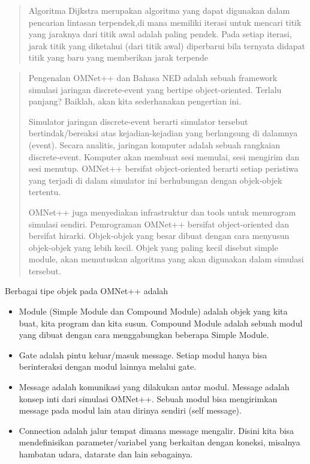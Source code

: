 \documentclass[conference]{IEEEtran}
\begin{document}
\begin{abstract}
    Algoritma Dijkstra merupakan algoritma yang dapat digunakan dalam
    pencarian lintasan terpendek,di mana memiliki iterasi untuk mencari titik yang jaraknya
    dari titik awal adalah paling pendek. Pada setiap iterasi, jarak titik yang diketahui (dari titik
    awal) diperbarui bila ternyata didapat titik yang baru yang memberikan jarak terpende

\end{abstract}
\begin{abstract}
Pengenalan OMNet++ dan Bahasa NED
      adalah sebuah framework simulasi jaringan discrete-event yang bertipe object-oriented. Terlalu panjang? Baiklah, akan kita sederhanakan pengertian ini.

Simulator jaringan discrete-event berarti simulator tersebut bertindak/bereaksi atas kejadian-kejadian yang berlangsung di dalamnya (event). Secara analitis, jaringan komputer adalah sebuah rangkaian discrete-event. Komputer akan membuat sesi memulai, sesi mengirim dan sesi menutup. OMNet++ bersifat object-oriented berarti setiap peristiwa yang terjadi di dalam simulator ini berhubungan dengan objek-objek tertentu.

OMNet++ juga menyediakan infrastruktur dan tools untuk memrogram simulasi sendiri. Pemrograman OMNet++ bersifat object-oriented dan bersifat hirarki. Objek-objek yang besar dibuat dengan cara menyusun objek-objek yang lebih kecil. Objek yang paling kecil disebut simple module, akan memutuskan algoritma yang akan digunakan dalam simulasi tersebut.

\end{abstract}
Berbagai tipe objek pada OMNet++ adalah
\begin{itemize}
\item Module (Simple Module dan Compound Module) adalah objek yang kita buat, kita program dan kita susun. Compound Module adalah sebuah modul yang dibuat dengan cara menggabungkan beberapa Simple Module.

\item Gate adalah pintu keluar/masuk message. Setiap modul hanya bisa berinteraksi dengan modul lainnya melalui gate.

\item Message adalah komunikasi yang dilakukan antar modul. Message adalah konsep inti dari simulasi OMNet++. Sebuah modul bisa mengirimkan message pada modul lain atau dirinya sendiri (self message).

\item Connection adalah jalur tempat dimana message mengalir. Disini kita bisa mendefinisikan parameter/variabel yang berkaitan dengan koneksi, misalnya hambatan udara, datarate dan lain sebagainya.
\end{itemize}
\end{document}
